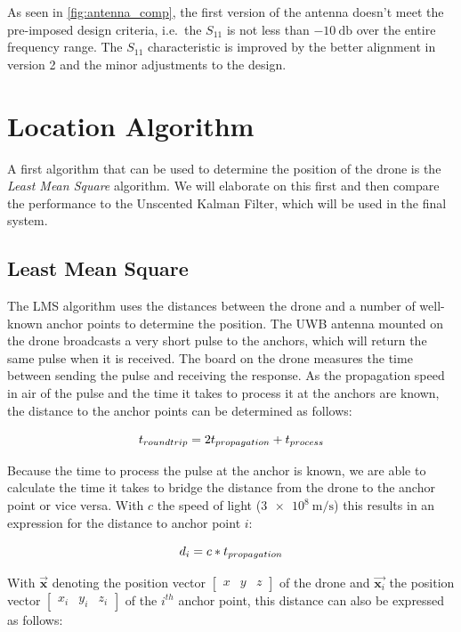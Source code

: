 \documentclass[a4paper]{article}        %
\begin{document}
		As seen in \autoref{fig:antenna_comp}, the first version of the antenna doesn't meet the pre-imposed design criteria, i.e.\ the $S_{11}$ is not less than $\SI{-10}{\decibel}$ over the entire frequency range.
		The $S_{11}$ characteristic is improved by the better alignment in version 2 and the minor adjustments to the design.

		



\section{Location Algorithm}
	A first algorithm that can be used to determine the position of the drone is the \textit{Least Mean Square} algorithm. We will elaborate on this first and then compare the performance to the Unscented Kalman Filter, which will be used in the final system. 

	\subsection{Least Mean Square}
	\label{subsec:LMS}

		The LMS algorithm uses the distances between the drone and a number of well-known anchor points to determine the position. The UWB antenna mounted on the drone broadcasts a very short pulse to the anchors, which will return the same pulse when it is received. The board on the drone measures the time between sending the pulse and receiving the response. As the propagation speed in air of the pulse and the time it takes to process it at the anchors are known, the distance to the anchor points can be determined as follows:

		\begin{equation}
		\centering
			t_{roundtrip} = 2t_{propagation} + t_{process}
		\end{equation} 

		Because the time to process the pulse at the anchor is known, we are able to calculate the time it takes to bridge the distance from the drone to the anchor point or vice versa. With $c$ the speed of light ($\SI{3e8}{\meter\per\second}$) this results in an expression for the distance to anchor point $i$:

		\begin{equation}
		\centering
			d_i = c*t_{propagation}
		\end{equation}

		With $\vec{\textbf{x}}$ denoting the position vector $\begin{bmatrix} x & y & z \end{bmatrix}$ of the drone and $\vec{\textbf{x}_i}$ the position vector $\begin{bmatrix} x_i & y_i & z_i \end{bmatrix}$ of the $i^{th}$ anchor point, this distance can also be expressed as follows:
\end{document}
